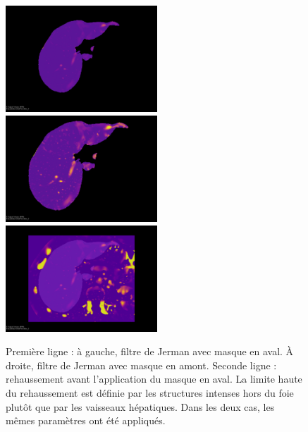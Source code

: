 \begin{figure}[!ht]
  \centering
  \includegraphics[height=4cm]{Images/globInfo_noM_loc.png}
  \includegraphics[height=4cm]{Images/globInfo_M_loc.png}
  \includegraphics[height=4cm]{Images/globInfo_noM_glob.png}
  \caption{Première ligne : à gauche, filtre de Jerman avec masque en aval. À droite, filtre de Jerman avec masque en amont. Seconde ligne : rehaussement avant l'application du masque en aval. La limite haute du rehaussement est définie par les structures intenses hors du foie plutôt que par les vaisseaux hépatiques. Dans les deux cas, les mêmes paramètres ont été appliqués.}
  \label{fig:smart_mask_effect}
\end{figure}


